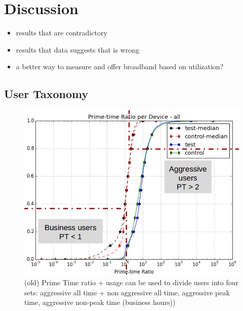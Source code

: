 \section{Discussion}
\label{sec:discussion}

\begin{itemize}
\itemsep0em
\item results that are contradictory
\item results that data suggests that is wrong
\item a better way to measure and offer broadband based on utilization?
\end{itemize}


\subsection{User Taxonomy}
\label{subsec:taxonomy}


\begin{figure}[ht!]
\begin{minipage}{0.9\linewidth}
\centering
\includegraphics[width=0.9\linewidth]{figures/cdf-prime-time-ratio[replace].png}
\caption{(old) Prime Time ratio + usage can be used to divide users into four sets: aggressive all time + non aggressive all time, aggressive peak time, aggressive non-peak time (business hours))}
\label{fig:CDF-prime-time-ratio}
\end{minipage}
\end{figure}


